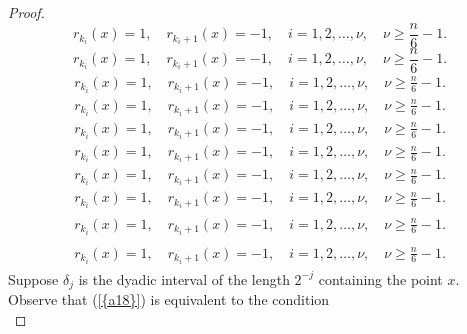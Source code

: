 \documentclass{amsart}
\numberwithin{equation}{section}
\begin{document}
\begin{proof}
{
\begin{equation*} \label{a18}
r_{k_i}(x)=1,\quad r_{k_i+1}(x)=-1,\quad i=1,2,\ldots , \nu,\quad \nu\ge \frac{n}{6}-1.
 \end{equation*}\fi  
{}\begin{equation}\label{a18}
r_{k_i}(x)=1,\quad r_{k_i+1}(x)=-1,\quad i=1,2,\ldots , \nu,\quad \nu\ge \frac{n}{6}-1.
\end{equation}\fi   
{}\begin{align*}\label{a18}
r_{k_i}(x)=1,\quad r_{k_i+1}(x)=-1,\quad i=1,2,\ldots , \nu,\quad \nu\ge \frac{n}{6}-1.
\end{align*}\fi   
{}\begin{align}\label{a18}
r_{k_i}(x)=1,\quad r_{k_i+1}(x)=-1,\quad i=1,2,\ldots , \nu,\quad \nu\ge \frac{n}{6}-1.
\end{align}\fi    
{}\begin{gather*}\label{a18}
r_{k_i}(x)=1,\quad r_{k_i+1}(x)=-1,\quad i=1,2,\ldots , \nu,\quad \nu\ge \frac{n}{6}-1.
\end{gather*}\fi  
{}\begin{gather}\label{a18}
r_{k_i}(x)=1,\quad r_{k_i+1}(x)=-1,\quad i=1,2,\ldots , \nu,\quad \nu\ge \frac{n}{6}-1.
\end{gather}\fi   
{}\begin{multline*}\label{a18}
r_{k_i}(x)=1,\quad r_{k_i+1}(x)=-1,\quad i=1,2,\ldots , \nu,\quad \nu\ge \frac{n}{6}-1.
\end{multline*}\fi  
{}\begin{multline}\label{a18}
r_{k_i}(x)=1,\quad r_{k_i+1}(x)=-1,\quad i=1,2,\ldots , \nu,\quad \nu\ge \frac{n}{6}-1.
\end{multline}\fi  
{}\begin{multline*}\begin{split}\label{a18}
r_{k_i}(x)=1,\quad r_{k_i+1}(x)=-1,\quad i=1,2,\ldots , \nu,\quad \nu\ge \frac{n}{6}-1.
\end{split}\end{multline*}\fi
{}\begin{multline}\begin{split}\label{a18}
r_{k_i}(x)=1,\quad r_{k_i+1}(x)=-1,\quad i=1,2,\ldots , \nu,\quad \nu\ge \frac{n}{6}-1.
\end{split}\end{multline}\fi
}
 Suppose $\delta_j$ is the dyadic interval of the length $2^{-j}$ containing the point $x$. Observe that {(\ref{{a18}})} is equivalent to the condition
{
\begin{equation*} \label{a28}

\end{equation*}}
\end{proof}
\end{document}
